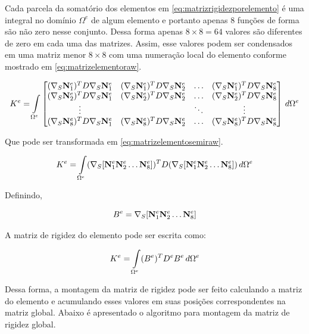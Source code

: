 Cada parcela da somatório dos elementos em \eqref{eq:matrizrigidezporelemento} é uma integral no domínio $\Omega^e$ de algum elemento e portanto apenas 8 funções de forma são não zero nesse conjunto. Dessa forma apenas $8\times8=64$ valores são diferentes de zero em cada uma das matrizes. Assim, esse valores podem ser condensados em uma matriz menor $8\times8$ com uma numeração local do elemento conforme mostrado em \eqref{eq:matrizelementoraw}.

\begin{equation}\label{eq:matrizelementoraw}
    K^e = 
\omeeint{
\begin{bmatrix}
\kije{1}{1} & \kije{1}{2}  & \hdots & \kije{1}{8}  \\ 
\kije{2}{1} & \kije{2}{2}  & \hdots & \kije{2}{8}  \\ 
\vdots      &              & \ddots & \vdots       \\ 
\kije{8}{1} & \kije{8}{2}  & \hdots & \kije{8}{8} 
\end{bmatrix}
}
\end{equation}

Que pode ser transformada em \eqref{eq:matrizelementosemiraw}.

\begin{equation}\label{eq:matrizelementosemiraw}
    K^e =\omeeint{ (\sopnabla [\basefunctionelem[1] \basefunctionelem[2] \hdots \basefunctionelem[8] ]) ^T D (\sopnabla [\basefunctionelem[1] \basefunctionelem[2] \hdots \basefunctionelem[8]])}
\end{equation}

Definindo, 

\begin{equation}
    B^e = \sopnabla [\basefunctionelem[1] \basefunctionelem[2] \hdots \basefunctionelem[8] ]
\end{equation}

A matriz de rigidez do elemento pode ser escrita como:

\begin{equation} \label{eq:}
    K^e = \omeeint{(B^e)^T D^e B^e}
\end{equation}


Dessa forma, a montagem da matriz de rigidez pode ser feito calculando a matriz do elemento e acumulando esses valores em suas posições correspondentes na matriz global. Abaixo é apresentado  o algoritmo para montagem da matriz de rigidez global.

\vspace{1cm}

